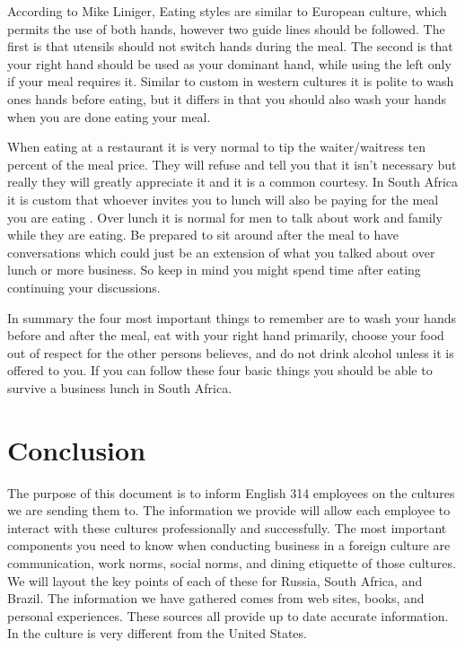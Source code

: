 \documentclass[11pt,a4paper,twoside]{report}
\begin{document}
According to Mike Liniger, Eating styles are similar to European culture, which
permits the use of both hands, however two guide lines should be followed. The
first is that utensils should not switch hands during the meal.  The second is
that your right hand should be used as your dominant hand, while using the left
only if your meal requires it. Similar to custom in western cultures it is
polite to wash ones hands before eating, but it differs in that you should also
wash your hands when you are done eating your meal.

When eating at a restaurant it is very normal to tip the waiter/waitress ten
percent of the meal price. They will refuse and tell you that it isn’t
necessary but really they will greatly appreciate it and it is a common
courtesy. In South Africa it is custom that whoever invites you to lunch will
also be paying for the meal you are eating \citep*{lininger}. Over lunch it is
normal for men to talk about work and family while they are eating. Be prepared
to sit around after the meal to have conversations which could just be an
extension of what you talked about over lunch or more business. So keep in mind
you might spend time after eating continuing your discussions.

In summary the four most important things to remember are to wash your hands
before and after the meal, eat with your right hand primarily, choose your food
out of respect for the other persons believes, and do not drink alcohol unless
it is offered to you. If you can follow these four basic things you should be
able to survive a business lunch in South Africa.

\chapter{Conclusion}

The purpose of this document is to inform English 314 employees on the cultures
we are sending them to.  The information we provide will allow each employee to
interact with these cultures professionally and successfully. The most
important components you need to know when conducting business in a foreign
culture are communication, work norms, social norms, and dining etiquette of
those cultures. We will layout the key points of each of these for Russia,
South Africa, and Brazil. The information we have gathered comes from web
sites, books, and personal experiences. These sources all provide up to date
accurate information. In the culture is very different from the United
States.
\nocite{*}
\end{document}
